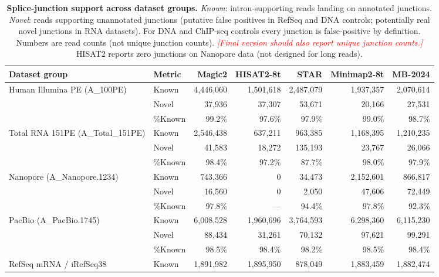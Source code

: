 \documentclass[11pt]{article}
\newcommand{\edcomment}[1]{\textcolor{red}{\textit{[#1]}}}
\begin{document}
\begin{table}[h]
\caption{\textbf{Splice-junction support across dataset groups.}
  \emph{Known}: intron-supporting reads landing on annotated junctions.
  \emph{Novel}: reads supporting unannotated junctions (putative
  false positives in RefSeq and DNA controls; potentially real novel
  junctions in RNA datasets).
  For DNA and ChIP-seq controls every junction is false-positive by
  definition.
  Numbers are read counts (not unique junction counts).
  \edcomment{Final version should also report unique junction counts.}
  HISAT2 reports zero junctions on Nanopore data (not designed for
  long reads).}
\label{tab:introns}
\scriptsize
\begin{tabular}{llrrrrr}
\toprule
\textbf{Dataset group} & \textbf{Metric} &
  \textbf{Magic2} & \textbf{HISAT2-8t} & \textbf{STAR} &
  \textbf{Minimap2-8t} & \textbf{MB-2024} \\
\midrule
\multirow{2}{*}{Human Illumina PE (A\_100PE)} &
  Known   & 4,446,060 & 1,501,618 & 2,487,079 & 1,937,357 & 2,070,614 \\
& Novel   &    37,936 &    37,307 &    53,671 &    20,166 &    27,531 \\
& \%Known &     99.2\% &     97.6\% &     97.9\% &     99.0\% &     98.7\% \\
\midrule
\multirow{3}{*}{Total RNA 151PE (A\_Total\_151PE)} &
  Known   & 2,546,438 &   637,211 &   963,385 & 1,168,395 & 1,210,235 \\
& Novel   &    41,583 &    18,272 &   135,193 &    23,767 &    26,066 \\
& \%Known &     98.4\% &     97.2\% &     87.7\% &     98.0\% &     97.9\% \\
\midrule
\multirow{3}{*}{Nanopore (A\_Nanopore.1234)} &
  Known   &   743,366 &         0 &    34,473 & 2,152,601 &   866,817 \\
& Novel   &    16,560 &         0 &     2,050 &    47,606 &    72,449 \\
& \%Known &     97.8\% & — & 94.4\% &     97.8\% &     92.3\% \\
\midrule
\multirow{3}{*}{PacBio (A\_PacBio.1745)} &
  Known   & 6,008,528 & 1,960,696 & 3,764,593 & 6,298,360 & 6,115,230 \\
& Novel   &    88,434 &    31,261 &    70,132 &    97,621 &    99,291 \\
& \%Known &     98.5\% &     98.4\% &     98.2\% &     98.5\% &     98.4\% \\
\midrule
\multirow{2}{*}{RefSeq mRNA / iRefSeq38} &
  Known   & 1,891,982 & 1,895,950 &   878,049 & 1,883,459 & 1,882,474 \\

\end{tabular}
\end{table}
\end{document}
